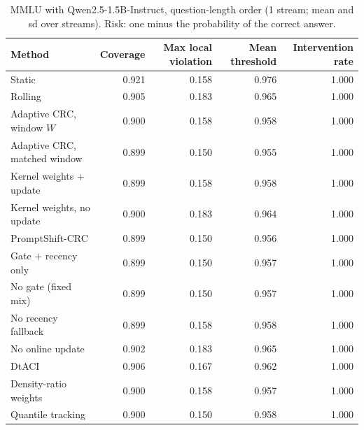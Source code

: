 \begin{table}[H]
\centering
\small
\caption{MMLU with Qwen2.5-1.5B-Instruct, question-length order (1 stream; mean and sd over streams). Risk: one minus the probability of the correct answer.}
\label{tab:mmlu_length_ascending}
\begin{tabular}{lrrrr}
\toprule
Method & Coverage & Max local violation & Mean threshold & Intervention rate \\
\midrule
Static & 0.921 & 0.158 & 0.976 & 1.000 \\
Rolling & 0.905 & 0.183 & 0.965 & 1.000 \\
Adaptive CRC, window $W$ & 0.900 & 0.158 & 0.958 & 1.000 \\
Adaptive CRC, matched window & 0.899 & 0.150 & 0.955 & 1.000 \\
Kernel weights + update & 0.899 & 0.158 & 0.958 & 1.000 \\
Kernel weights, no update & 0.900 & 0.183 & 0.964 & 1.000 \\
PromptShift-CRC & 0.899 & 0.150 & 0.956 & 1.000 \\
Gate + recency only & 0.899 & 0.150 & 0.957 & 1.000 \\
No gate (fixed mix) & 0.899 & 0.150 & 0.957 & 1.000 \\
No recency fallback & 0.899 & 0.158 & 0.958 & 1.000 \\
No online update & 0.902 & 0.183 & 0.965 & 1.000 \\
DtACI & 0.906 & 0.167 & 0.962 & 1.000 \\
Density-ratio weights & 0.900 & 0.158 & 0.957 & 1.000 \\
Quantile tracking & 0.900 & 0.150 & 0.958 & 1.000 \\
\bottomrule
\end{tabular}
\end{table}

